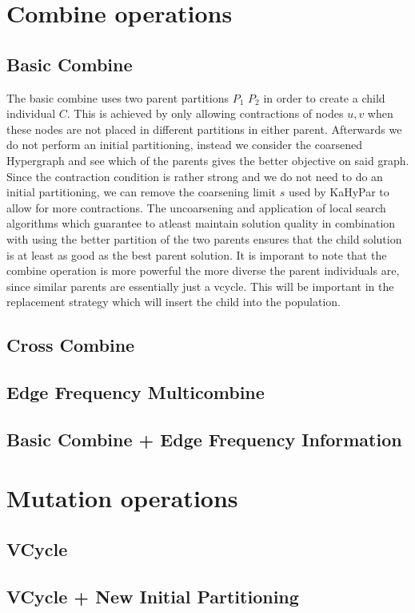 \documentclass[a4paper,12pt,bibtotoc,titlepage, liststotoc,BCOR7mm,headsepline,pointlessnumbers]{scrbook}
\numberwithin{equation}{section}
\begin{document}
\section{Combine operations}
\subsection{Basic Combine}
The basic combine uses two parent partitions $P_1$ $P_2$ in order to create a child individual $C$. This is achieved by only allowing contractions of nodes $u, v$ when these nodes are not placed in different partitions in either parent. Afterwards we do not perform an initial partitioning, instead we consider the coarsened Hypergraph and see which of the parents gives the better objective on said graph. 
Since the contraction condition is rather strong and we do not need to do an initial partitioning, we can remove the coarsening limit $s$ used by KaHyPar
to allow for more contractions. The uncoarsening and application of local search algorithms which guarantee to atleast maintain solution quality in combination with using the better partition of the two parents ensures that the child solution is at least as good as the best parent solution. It is imporant to note that the combine operation is more powerful the more diverse the parent individuals are, since similar parents are essentially just a vcycle. This will be important in the replacement strategy which will insert the child into the population. 
\subsection{Cross Combine}

\subsection{Edge Frequency Multicombine}
\subsection{Basic Combine + Edge Frequency Information}
\section{Mutation operations}
\subsection{VCycle}
\subsection{VCycle + New Initial Partitioning}
\end{document}
